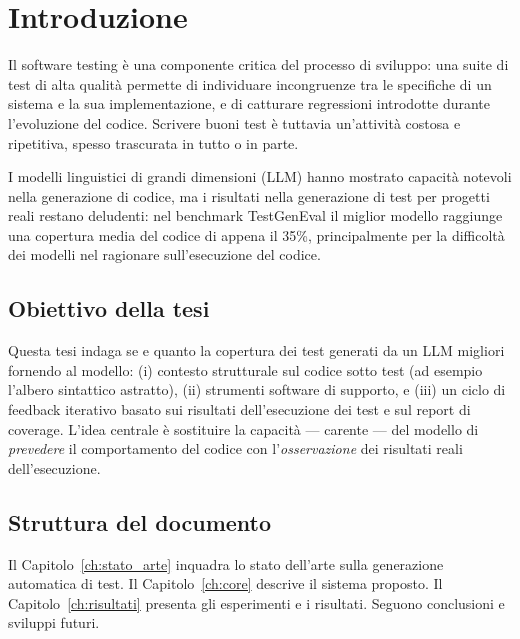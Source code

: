 \chapter{Introduzione}
\label{ch:introduzione}


Il software testing è una componente critica del processo di sviluppo: una
suite di test di alta qualità permette di individuare incongruenze tra le
specifiche di un sistema e la sua implementazione, e di catturare regressioni
introdotte durante l'evoluzione del codice. Scrivere buoni test è tuttavia
un'attività costosa e ripetitiva, spesso trascurata in tutto o in parte.

I modelli linguistici di grandi dimensioni (LLM) hanno mostrato capacità
notevoli nella generazione di codice, ma i risultati nella generazione di
test per progetti reali restano deludenti: nel benchmark TestGenEval il
miglior modello raggiunge una copertura media del codice di appena il 35\%,
principalmente per la difficoltà dei modelli nel ragionare sull'esecuzione
del codice.

\section{Obiettivo della tesi}
Questa tesi indaga se e quanto la copertura dei test generati da un LLM
migliori fornendo al modello: (i) contesto strutturale sul codice sotto test
(ad esempio l'albero sintattico astratto), (ii) strumenti software di
supporto, e (iii) un ciclo di feedback iterativo basato sui risultati
dell'esecuzione dei test e sul report di coverage. L'idea centrale è
sostituire la capacità --- carente --- del modello di \emph{prevedere} il
comportamento del codice con l'\emph{osservazione} dei risultati reali
dell'esecuzione.

\section{Struttura del documento}
Il Capitolo~\ref{ch:stato_arte} inquadra lo stato dell'arte sulla
generazione automatica di test. Il Capitolo~\ref{ch:core} descrive il
sistema proposto. Il Capitolo~\ref{ch:risultati} presenta gli esperimenti e
i risultati. Seguono conclusioni e sviluppi futuri.
